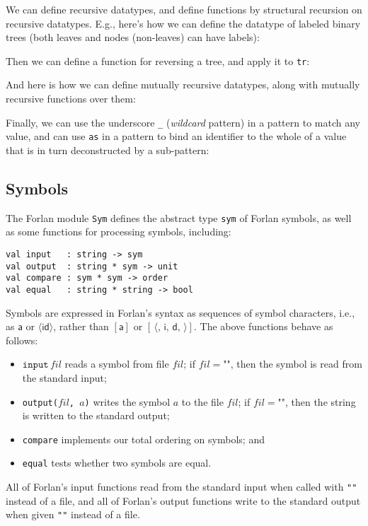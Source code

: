 %
%
We can define recursive datatypes, and define functions
by structural recursion on recursive datatypes. E.g., here's how
we can define the datatype of labeled binary trees (both leaves and
nodes (non-leaves) can have labels):

Then we can define a function for reversing a tree, and apply it to
\texttt{tr}:

And here is how we can define mutually recursive datatypes, along with
mutually recursive functions over them:


Finally, we can use the underscore \verb^_^ (\emph{wildcard} pattern) in a
pattern to match any value, and can use \texttt{as} in a pattern to
bind an identifier
%
%
%
%
to the whole of a value that is in turn deconstructed by a
sub-pattern: 
%

\subsection{Symbols}

The Forlan module \texttt{Sym}
%
defines the abstract type \texttt{sym}
%
%
of Forlan symbols,
%
as well as some functions for processing symbols, including:
\begin{verbatim}
val input   : string -> sym
val output  : string * sym -> unit
val compare : sym * sym -> order
val equal   : string * string -> bool
\end{verbatim}
%
%
%
Symbols are expressed in Forlan's syntax as sequences of symbol
characters, i.e., as $\mathsf{a}$ or $\langle\mathsf{id}\rangle$,
rather than $[\mathsf{a}]$ or $\mathsf{[\,\langle,\,i,\,d,\,\rangle]}$.
The above functions behave as follows:
\begin{itemize}
\item $\mathtt{input}\,\mathit{fil}$ reads a symbol from file
$\mathit{fil}$; if $\mathit{fil} = \texttt{""}$, then the symbol is
read from the standard input;

\item \texttt{output($\mathit{fil}$,\,$a$)} writes the symbol $a$ to
the file $\mathit{fil}$; if $\mathit{fil} = \texttt{""}$, then the
string is written to the standard output;

\item \texttt{compare} implements our total ordering on symbols; and

\item \texttt{equal} tests whether two symbols are equal.
\end{itemize}
All of Forlan's input functions read from the standard input
when called with \texttt{""} instead of a file, and all of Forlan's
output functions write to the standard output when given
\texttt{""} instead of a file.


